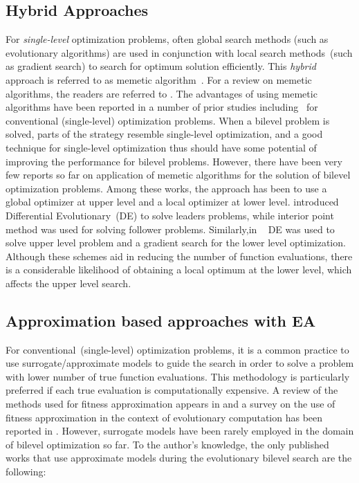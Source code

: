 \subsection{Hybrid Approaches}
For \emph{single-level} optimization problems, often global search methods (such as evolutionary algorithms) are used in conjunction with local search methods~(such as gradient search) to search for optimum solution efficiently. This \emph{hybrid} approach is referred to as memetic algorithm~\cite{moscato1989evolution}. For a review on memetic algorithms, the readers are referred to \cite{moscato2004memetic}. The advantages of using memetic algorithms have been reported in a number of prior studies including~\cite{singh2011performance} for conventional (single-level) optimization problems. When a bilevel problem is solved, parts of the strategy resemble single-level optimization, and a good technique for single-level optimization thus should have some potential of improving the performance for bilevel problems. However, there have been very few reports so far on application of memetic algorithms for the solution of bilevel optimization problems. Among these works, the approach has been to use a global optimizer at upper level and a local optimizer at lower level. \cite{Zhubilevel} introduced Differential Evolutionary~(DE) to solve leaders problems, while interior point method was used for solving follower problems. Similarly,in ~\cite{koh2013metaheuristic} DE was used to solve upper level problem and a gradient search for the lower level optimization. Although these schemes aid in reducing the number of function evaluations, there is a considerable likelihood of obtaining a local optimum at the lower level, which affects the upper level search.



\subsection{Approximation based approaches with EA}
\label{sec:approx_ea_ch2}
For conventional~(single-level) optimization problems, it is a common practice to use surrogate/approximate models to guide the search in order to solve a problem with lower number of true function evaluations. This methodology is particularly preferred if each true evaluation is computationally expensive. A review of the methods used for fitness approximation appears in \cite{wang_review_2007} and a survey on the use of fitness approximation in the context of evolutionary computation has been reported in \cite{jin2005csf}. However, surrogate models have been rarely employed in the domain of bilevel optimization so far. To the author's knowledge, the only published works that use approximate models during the evolutionary bilevel search are the following:

